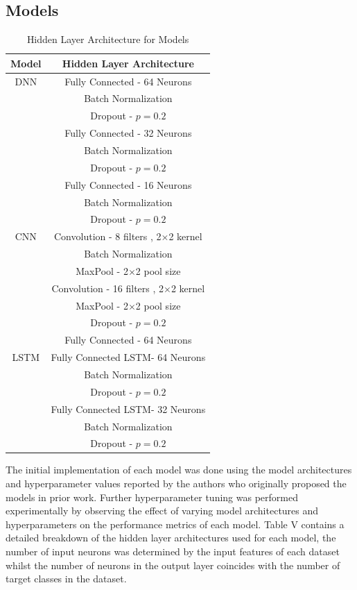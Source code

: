 \documentclass[conference]{IEEEtran}
\begin{document}
\subsection{Models}

\begin{table}[htbp]
\caption{Hidden Layer Architecture for Models}
\begin{center}
\begin{tabular}{|c|c|}
\hline
\textbf{Model} & \textbf{Hidden Layer Architecture}\\[2pt]
\hline
DNN & Fully Connected -  64 Neurons\\[2pt]
    & Batch Normalization\\[2pt]
    & Dropout - $p=0.2$\\[2pt]
    & Fully Connected -  32 Neurons\\[2pt]
    & Batch Normalization \\[2pt]
    & Dropout - $p=0.2$ \\[2pt]
    & Fully Connected -  16 Neurons\\[2pt]
    & Batch Normalization \\[2pt]
    & Dropout - $p=0.2$ \\[2pt]
    
\hline 
CNN & Convolution -  8 filters , 2$\times$2 kernel\\[2pt]
    & Batch Normalization\\[2pt]
    & MaxPool - 2$\times$2 pool size\\[2pt]
    & Convolution -  16 filters , 2$\times$2 kernel\\[2pt]
    & MaxPool - 2$\times$2 pool size\\[2pt]
    & Dropout - $p=0.2$ \\[2pt]
    & Fully Connected -  64 Neurons \\[2pt]
\hline 
LSTM & Fully Connected LSTM-  64 Neurons\\[2pt]
    & Batch Normalization\\[2pt]
    & Dropout - $p=0.2$\\[2pt]
    & Fully Connected LSTM-  32 Neurons\\[2pt]
    & Batch Normalization \\[2pt]
    & Dropout - $p=0.2$ \\[2pt]
\hline
\end{tabular}
\label{tab1}
\end{center}
\end{table}

The initial implementation of each model was done using the model architectures and hyperparameter values reported by the authors who originally proposed the models in prior work. Further hyperparameter tuning was performed experimentally by observing the effect of varying model architectures and hyperparameters on the performance metrics of each model. Table V contains a detailed breakdown of the hidden layer architectures used for each model, the number of input neurons was determined by the input features of each dataset whilst the number of neurons in the output layer coincides with the number of target classes in the dataset.
\end{document}
